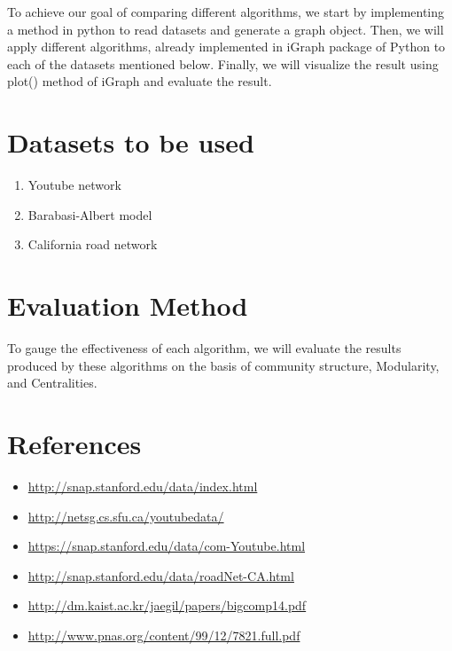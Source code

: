 \documentclass[12pt]{article}
\begin{document}
To achieve our goal of comparing different algorithms, we start by implementing a method in python to read datasets and generate a graph object. Then, we will apply different algorithms, already implemented in iGraph package of Python to each of the datasets mentioned below. Finally, we will visualize the result using plot() method of iGraph and evaluate the result.

\section{Datasets to be used}

\begin{enumerate}
\item Youtube network
\item Barabasi-Albert model
\item California road network
\end{enumerate}

\section{Evaluation Method}

To gauge the effectiveness of each algorithm, we will evaluate the results produced by these algorithms on the basis of community structure, Modularity, and Centralities.


\section{References}

\begin{itemize}
\item \url{http://snap.stanford.edu/data/index.html}
\item \url{http://netsg.cs.sfu.ca/youtubedata/}
\item \url{https://snap.stanford.edu/data/com-Youtube.html}
\item \url{http://snap.stanford.edu/data/roadNet-CA.html}
\item \url{http://dm.kaist.ac.kr/jaegil/papers/bigcomp14.pdf}
\item \url{http://www.pnas.org/content/99/12/7821.full.pdf}
\end{itemize}
\end{document}
